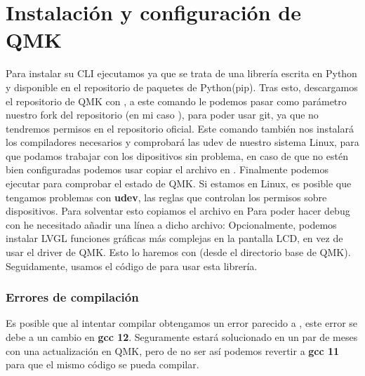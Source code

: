 \section{Instalación y configuración de QMK}
Para instalar su CLI ejecutamos  ya que se trata de una librería escrita en Python y disponible en el repositorio de paquetes de Python(pip). \newline
Tras esto, descargamos el repositorio de QMK con , a este comando le podemos pasar como parámetro nuestro fork del repositorio (en mi caso ), para poder usar git, ya que no tendremos permisos en el repositorio oficial. Este comando también nos instalará los compiladores necesarios y comprobará las udev de nuestro sistema Linux, para que podamos trabajar con los dipositivos sin problema, en caso de que no estén bien configuradas podemos usar copiar el archivo  en . Finalmente podemos ejecutar  para comprobar el estado de QMK.
Si estamos en Linux, es posible que tengamos problemas con \textbf{udev}, las reglas que controlan los permisos sobre dispositivos. Para solventar esto copiamos el archivo  en  
Para poder hacer debug con  he necesitado añadir una línea a dicho archivo: \newline
{} \vspace{0.5cm} 
Opcionalmente, podemos instalar LVGL funciones gráficas más complejas en la pantalla LCD, en vez de usar el driver de QMK. Esto lo haremos con \newline
{} (desde el directorio base de QMK). Seguidamente, usamos el código de  para usar esta librería.
    \subsubsection{Errores de compilación}
    Es posible que al intentar compilar obtengamos un error parecido a \newline
    , este error se debe a un cambio en \textbf{gcc 12}. Seguramente estará solucionado en un par de meses con una actualización en QMK, pero de no ser así podemos revertir a \textbf{gcc 11} para que el mismo código se pueda compilar.

